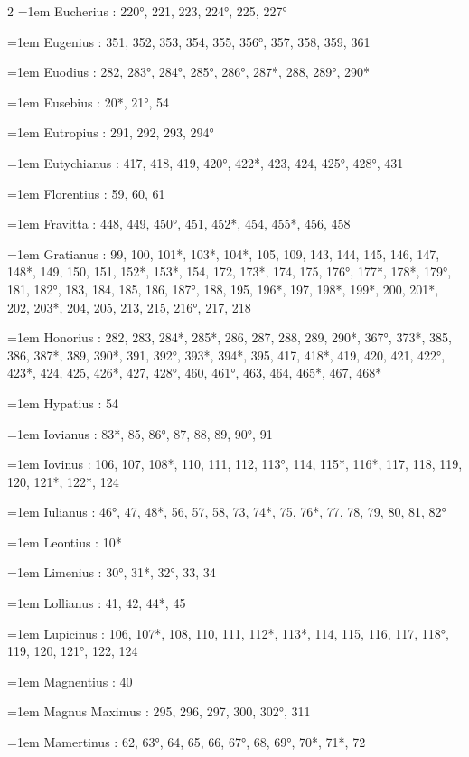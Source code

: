 \begin{multicols}{2}
\hangindent=1em Eucherius : 220°, 221, 223, 224°, 225, 227°\par
\hangindent=1em Eugenius : 351, 352, 353, 354, 355, 356°, 357, 358, 359, 361\par
\hangindent=1em Euodius : 282, 283°, 284°, 285°, 286°, 287*, 288, 289°, 290*\par
\hangindent=1em Eusebius : 20*, 21°, 54\par
\hangindent=1em Eutropius : 291, 292, 293, 294°\par
\hangindent=1em Eutychianus : 417, 418, 419, 420°, 422*, 423, 424, 425°, 428°, 431\par
\hangindent=1em Florentius : 59, 60, 61\par
\hangindent=1em Fravitta : 448, 449, 450°, 451, 452*, 454, 455*, 456, 458\par
\hangindent=1em Gratianus : 99, 100, 101*, 103*, 104*, 105, 109, 143, 144, 145, 146, 147, 148*, 149, 150, 151, 152*, 153*, 154, 172, 173*, 174, 175, 176°, 177*, 178*, 179°, 181, 182°, 183, 184, 185, 186, 187°, 188, 195, 196*, 197, 198*, 199*, 200, 201*, 202, 203*, 204, 205, 213, 215, 216°, 217, 218\par
\hangindent=1em Honorius : 282, 283, 284*, 285*, 286, 287, 288, 289, 290*, 367°, 373*, 385, 386, 387*, 389, 390*, 391, 392°, 393*, 394*, 395, 417, 418*, 419, 420, 421, 422°, 423*, 424, 425, 426*, 427, 428°, 460, 461°, 463, 464, 465*, 467, 468*\par
\hangindent=1em Hypatius : 54\par
\hangindent=1em Iovianus : 83*, 85, 86°, 87, 88, 89, 90°, 91\par
\hangindent=1em Iovinus : 106, 107, 108*, 110, 111, 112, 113°, 114, 115*, 116*, 117, 118, 119, 120, 121*, 122*, 124\par
\hangindent=1em Iulianus : 46°, 47, 48*, 56, 57, 58, 73, 74*, 75, 76*, 77, 78, 79, 80, 81, 82°\par
\hangindent=1em Leontius : 10*\par
\hangindent=1em Limenius : 30°, 31*, 32°, 33, 34\par
\hangindent=1em Lollianus : 41, 42, 44*, 45\par
\hangindent=1em Lupicinus : 106, 107*, 108, 110, 111, 112*, 113*, 114, 115, 116, 117, 118°, 119, 120, 121°, 122, 124\par
\hangindent=1em Magnentius : 40\par
\hangindent=1em Magnus Maximus : 295, 296, 297, 300, 302°, 311\par
\hangindent=1em Mamertinus : 62, 63°, 64, 65, 66, 67°, 68, 69°, 70*, 71*, 72\par

\end{multicols}
